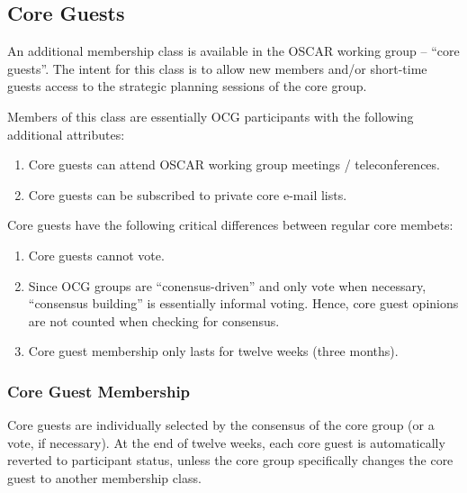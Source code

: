 
\subsection{Core Guests}

An additional membership class is available in the OSCAR working group
-- ``core guests''.  The intent for this class is to allow new members
and/or short-time guests access to the strategic planning sessions of
the core group.

Members of this class are essentially OCG participants with the
following additional attributes:

\begin{enumerate}
\item Core guests can attend OSCAR working group meetings /
  teleconferences.
  
\item Core guests can be subscribed to private core e-mail lists.
\end{enumerate}

Core guests have the following critical differences between regular
core membets:

\begin{enumerate}
\item Core guests cannot vote.
  
\item Since OCG groups are ``conensus-driven'' and only vote when
  necessary, ``consensus building'' is essentially informal voting.
  Hence, core guest opinions are not counted when checking for
  consensus.
  
\item Core guest membership only lasts for twelve weeks (three
  months).  
\end{enumerate}

\subsubsection{Core Guest Membership}

Core guests are individually selected by the consensus of the core
group (or a vote, if necessary).  At the end of twelve weeks, each
core guest is automatically reverted to participant status, unless the
core group specifically changes the core guest to another membership
class.

